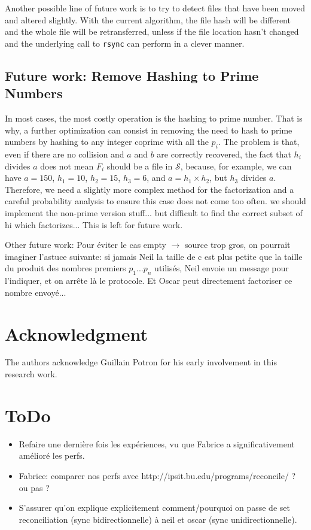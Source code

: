 \documentclass[11pt]{llncs}
\newcommand{\rsync}{\texttt{rsync}\xspace}
\begin{document}
Another possible line of future work is to try to detect files that have been
moved and altered slightly. With the current algorithm, the file hash will be
different and the whole file will be retransferred, unless if the file location
hasn't changed and the underlying call to \rsync can perform in a clever manner.

\subsection{Future work: Remove Hashing to Prime Numbers}

In most cases, the most costly operation is the hashing to prime number.
That is why, a further optimization can consist in removing the need to hash to prime numbers by hashing to any integer coprime with all the $p_i$.
The problem is that, even if there are no collision and $a$ and $b$ are correctly recovered, the fact that $h_i$ divides $a$ does not mean $F_i$ should be a file in $\mathcal{S}$, because, for example, we can have $a = 150$, $h_1 = 10$, $h_2 = 15$, $h_3 = 6$, and $a = h_1 \times h_2$, but $h_3$ divides $a$.
Therefore, we need a slightly more complex method for the factorization and a careful probability analysis to ensure this case does not come too often.
we should implement the non-prime version stuff... but difficult to find the correct subset of hi which factorizes...
This is left for future work.

Other future work: Pour éviter le cas empty $\rightarrow$ source trop gros, on pourrait imaginer l'astuce suivante: si jamais Neil la taille de c est plus petite que la taille du produit des nombres premiers $p_1$...$p_n$ utilisés, Neil envoie un message pour l'indiquer, et on arr\^ete là le protocole. Et Oscar peut directement factoriser ce nombre envoyé...

\section{Acknowledgment}

The authors acknowledge Guillain Potron for his early involvement in this research work.

\section{ToDo}

\begin{itemize}
\item Refaire une dernière fois les expériences, vu que Fabrice a significativement amélioré les perfs.
\item Fabrice: comparer nos perfs avec http://ipsit.bu.edu/programs/reconcile/ ? ou pas ?
\item S'assurer qu'on explique explicitement comment/pourquoi on passe de set
  reconciliation (sync bidirectionnelle) à neil et oscar (sync
  unidirectionnelle).
\end{itemize}
\end{document}
